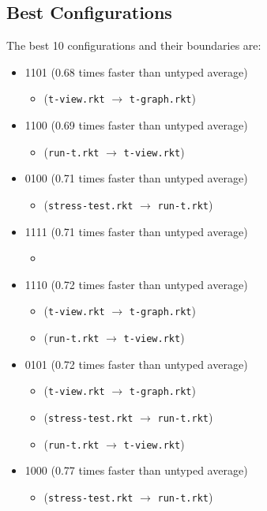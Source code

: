 \documentclass{article}
\newcommand{\mono}[1]{\texttt{#1}}
\begin{document}
\subsection{Best Configurations}
The best 10 configurations and their boundaries are:
\begin{itemize}
\item 1101 (0.68 times faster than untyped average)
  \begin{itemize}
  \item (\mono{t-view.rkt} $\rightarrow$ \mono{t-graph.rkt})
  \end{itemize}
\item 1100 (0.69 times faster than untyped average)
  \begin{itemize}
  \item (\mono{run-t.rkt} $\rightarrow$ \mono{t-view.rkt})
  \end{itemize}
\item 0100 (0.71 times faster than untyped average)
  \begin{itemize}
  \item (\mono{stress-test.rkt} $\rightarrow$ \mono{run-t.rkt})
  \end{itemize}
\item 1111 (0.71 times faster than untyped average)
  \begin{itemize}
  \item 
  \end{itemize}
\item 1110 (0.72 times faster than untyped average)
  \begin{itemize}
  \item (\mono{t-view.rkt} $\rightarrow$ \mono{t-graph.rkt})
  \item (\mono{run-t.rkt} $\rightarrow$ \mono{t-view.rkt})
  \end{itemize}
\item 0101 (0.72 times faster than untyped average)
  \begin{itemize}
  \item (\mono{t-view.rkt} $\rightarrow$ \mono{t-graph.rkt})
  \item (\mono{stress-test.rkt} $\rightarrow$ \mono{run-t.rkt})
  \item (\mono{run-t.rkt} $\rightarrow$ \mono{t-view.rkt})
  \end{itemize}
\item 1000 (0.77 times faster than untyped average)
  \begin{itemize}
  \item (\mono{stress-test.rkt} $\rightarrow$ \mono{run-t.rkt})

\end{itemize}
\end{itemize}
\end{document}
